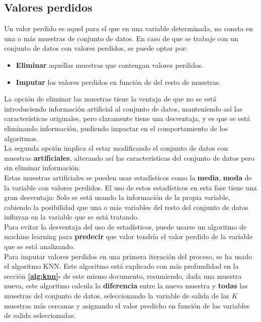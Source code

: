 \subsection{Valores perdidos}
Un valor perdido es aquel para el que en una variable determinada, no consta en una o más muestras de conjunto de datos. En caso de que se trabaje con un conjunto de datos con valores perdidos, se puede optar por:
\begin{itemize}
	\item \textbf{Eliminar} aquellas muestras que contengan valores perdidos.
	\item \textbf{Imputar} los valores perdidos en función de del resto de muestras.
\end{itemize}

La opción de eliminar las muestras tiene la ventaja de que no se está introduciendo información artificial al conjunto de datos, manteniendo así las características originales, pero claramente tiene una desventaja, y es que se está eliminando información, pudiendo impactar en el comportamiento de los algoritmos.\\
\linebreak
La segunda opción implica el estar modificando el conjunto de datos con muestras \textbf{artificiales}, alterando así las características del conjunto de datos pero sin eliminar información.\\
Estas muestras artificiales se pueden usar estadísticos como la \textbf{media}, \textbf{moda} de la variable con valores perdidos. El uso de estos estadísticos en esta fase tiene una gran desventaja: Solo se está usando la información de la propia variable, cabiendo la posibilidad que una o más variables del resto del conjunto de datos influyan en la variable que se está tratando. \\
\linebreak
Para evitar la desventaja del uso de estadísticos, puede usarse un algoritmo de machine learning para \textbf{predecir} que valor tendría el valor perdido de la variable que se está analizando. \\
\linebreak
Para imputar valores perdidos en una primera iteración del proceso, se ha usado el algoritmo KNN. Este algoritmo está explicado con más profundidad en la sección \textbf{\ref{alg:knn}-} de este mismo documento, resumiendo, dada una muestra nueva, este algoritmo calcula la \textbf{diferencia} entre la nueva muestra y \textbf{todas} las muestras del conjunto de datos, seleccionando la variable de salida de las $K$ muestras más cercanas y asignando el valor predicho en función de las variables de salida seleccionadas.
